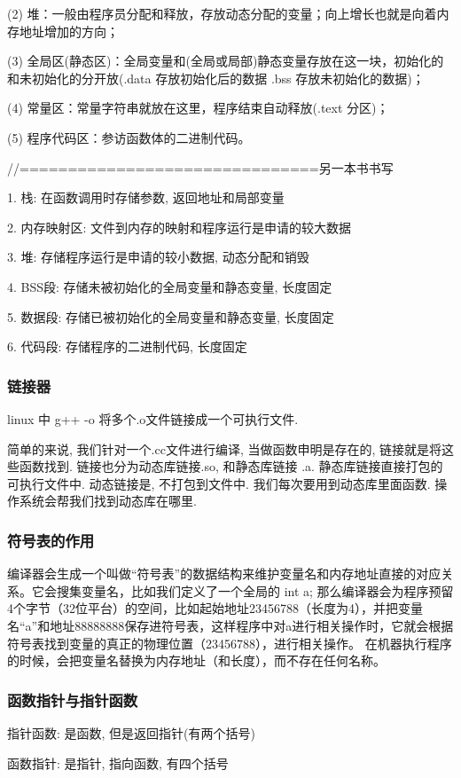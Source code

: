 \documentclass[UTF8]{ctexart}
\begin{document}
(2) 堆：一般由程序员分配和释放，存放动态分配的变量；向上增长也就是向着内存地址增加的方向；

(3) 全局区(静态区)：全局变量和(全局或局部)静态变量存放在这一块，初始化的和未初始化的分开放(.data 存放初始化后的数据  .bss 存放未初始化的数据)；

(4) 常量区：常量字符串就放在这里，程序结束自动释放(.text 分区)；

(5) 程序代码区：参访函数体的二进制代码。


//===============================另一本书书写

1. 栈: 在函数调用时存储参数, 返回地址和局部变量

2. 内存映射区: 文件到内存的映射和程序运行是申请的较大数据

3. 堆: 存储程序运行是申请的较小数据, 动态分配和销毁

4. BSS段: 存储未被初始化的全局变量和静态变量, 长度固定

5. 数据段: 存储已被初始化的全局变量和静态变量, 长度固定

6. 代码段: 存储程序的二进制代码, 长度固定

\subsubsection{链接器}
linux 中 g++ -o 将多个.o文件链接成一个可执行文件.

简单的来说, 我们针对一个.cc文件进行编译, 当做函数申明是存在的, 链接就是将这些函数找到. 链接也分为动态库链接.so, 和静态库链接 .a. 静态库链接直接打包的可执行文件中. 动态链接是, 不打包到文件中. 我们每次要用到动态库里面函数. 操作系统会帮我们找到动态库在哪里.

\subsubsection{符号表的作用}
编译器会生成一个叫做“符号表”的数据结构来维护变量名和内存地址直接的对应关系。它会搜集变量名，比如我们定义了一个全局的 int a; 那么编译器会为程序预留4个字节（32位平台）的空间，比如起始地址23456788（长度为4），并把变量名“a”和地址88888888保存进符号表，这样程序中对a进行相关操作时，它就会根据符号表找到变量的真正的物理位置（23456788），进行相关操作。 在机器执行程序的时候，会把变量名替换为内存地址（和长度），而不存在任何名称。


\subsubsection{函数指针与指针函数}
指针函数: 是函数, 但是返回指针(有两个括号) \par
函数指针: 是指针, 指向函数, 有四个括号 \par
\end{document}
